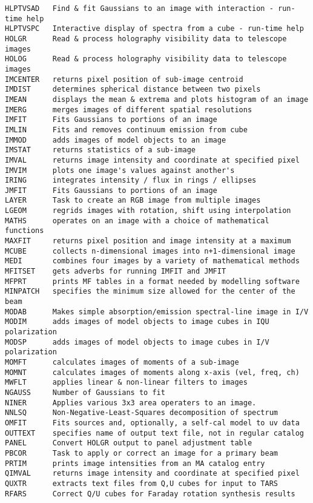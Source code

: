 \begin{verbatim}
HLPTVSAD   Find & fit Gaussians to an image with interaction - run-time help
HLPTVSPC   Interactive display of spectra from a cube - run-time help
HOLGR      Read & process holography visibility data to telescope images
HOLOG      Read & process holography visibility data to telescope images
IMCENTER   returns pixel position of sub-image centroid
IMDIST     determines spherical distance between two pixels
IMEAN      displays the mean & extrema and plots histogram of an image
IMERG      merges images of different spatial resolutions
IMFIT      Fits Gaussians to portions of an image
IMLIN      Fits and removes continuum emission from cube
IMMOD      adds images of model objects to an image
IMSTAT     returns statistics of a sub-image
IMVAL      returns image intensity and coordinate at specified pixel
IMVIM      plots one image's values against another's
IRING      integrates intensity / flux in rings / ellipses
JMFIT      Fits Gaussians to portions of an image
LAYER      Task to create an RGB image from multiple images
LGEOM      regrids images with rotation, shift using interpolation
MATHS      operates on an image with a choice of mathematical functions
MAXFIT     returns pixel position and image intensity at a maximum
MCUBE      collects n-dimensional images into n+1-dimensional image
MEDI       combines four images by a variety of mathematical methods
MFITSET    gets adverbs for running IMFIT and JMFIT
MFPRT      prints MF tables in a format needed by modelling software
MINPATCH   specifies the minimum size allowed for the center of the beam
MODAB      Makes simple absorption/emission spectral-line image in I/V
MODIM      adds images of model objects to image cubes in IQU polarization
MODSP      adds images of model objects to image cubes in I/V polarization
MOMFT      calculates images of moments of a sub-image
MOMNT      calculates images of moments along x-axis (vel, freq, ch)
MWFLT      applies linear & non-linear filters to images
NGAUSS     Number of Gaussians to fit
NINER      Applies various 3x3 area operaters to an image.
NNLSQ      Non-Negative-Least-Squares decomposition of spectrum
OMFIT      Fits sources and, optionally, a self-cal model to uv data
OUTTEXT    specifies name of output text file, not in regular catalog
PANEL      Convert HOLGR output to panel adjustment table
PBCOR      Task to apply or correct an image for a primary beam
PRTIM      prints image intensities from an MA catalog entry
QIMVAL     returns image intensity and coordinate at specified pixel
QUXTR      extracts text files from Q,U cubes for input to TARS
RFARS      Correct Q/U cubes for Faraday rotation synthesis results

\end{verbatim}
